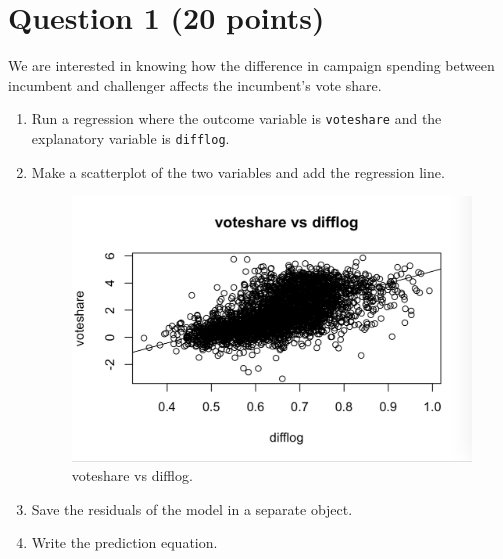\documentclass[12pt,letterpaper]{article}
\begin{document}
	\section*{Question 1 (20 points)}
	\vspace{.25cm}
	\noindent We are interested in knowing how the difference in campaign spending between incumbent and challenger affects the incumbent's vote share. 
	\begin{enumerate}
		\item Run a regression where the outcome variable is \texttt{voteshare} and the explanatory variable is \texttt{difflog}.	
			
		  
		
		\item Make a scatterplot of the two variables and add the regression line. 	
		
		  
			\begin{figure}[h!]
			\includegraphics[width=\linewidth]{PS31}
			\caption{voteshare vs difflog.}
			\label{fig:PS31}
			\end{figure}	
		
		\item Save the residuals of the model in a separate object.	
		
		  
		
		\item Write the prediction equation.
		
		  
		
	\end{enumerate}
	
\end{document}
